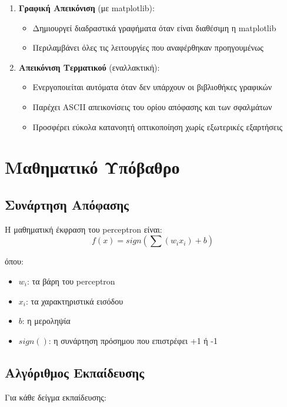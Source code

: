 \documentclass[12pt,a4paper,twoside]{book}
\begin{document}
\begin{enumerate}
    \item \textbf{Γραφική Απεικόνιση} (με matplotlib):
    \begin{itemize}
        \item Δημιουργεί διαδραστικά γραφήματα όταν είναι διαθέσιμη η matplotlib
        \item Περιλαμβάνει όλες τις λειτουργίες που αναφέρθηκαν προηγουμένως
    \end{itemize}

    \item \textbf{Απεικόνιση Τερματικού} (εναλλακτική):
    \begin{itemize}
        \item Ενεργοποιείται αυτόματα όταν δεν υπάρχουν οι βιβλιοθήκες γραφικών
        \item Παρέχει ASCII απεικονίσεις του ορίου απόφασης και των σφαλμάτων
        \item Προσφέρει εύκολα κατανοητή οπτικοποίηση χωρίς εξωτερικές εξαρτήσεις
    \end{itemize}
\end{enumerate}

\section{Μαθηματικό Υπόβαθρο}

\subsection{Συνάρτηση Απόφασης}

Η μαθηματική έκφραση του perceptron είναι:
\[f(x) = sign(\sum(w_ix_i) + b)\] %

όπου:
\begin{itemize}
    \item $w_i$: τα βάρη του perceptron
    \item $x_i$: τα χαρακτηριστικά εισόδου
    \item $b$: η μεροληψία
    \item $sign()$: η συνάρτηση πρόσημου που επιστρέφει +1 ή -1
\end{itemize}

\subsection{Αλγόριθμος Εκπαίδευσης}

Για κάθε δείγμα εκπαίδευσης:
\end{document}
